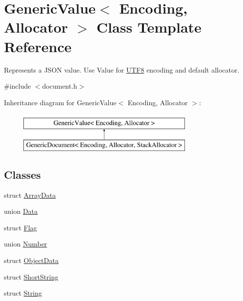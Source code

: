 \hypertarget{classGenericValue}{}\section{Generic\+Value$<$ Encoding, Allocator $>$ Class Template Reference}
\label{classGenericValue}


Represents a J\+S\+ON value. Use Value for \hyperlink{structUTF8}{U\+T\+F8} encoding and default allocator.  




{\ttfamily \#include $<$document.\+h$>$}

Inheritance diagram for Generic\+Value$<$ Encoding, Allocator $>$\+:\begin{figure}[H]
\begin{center}
\leavevmode
\includegraphics[height=2.000000cm]{classGenericValue}
\end{center}
\end{figure}
\subsection*{Classes}
\begin{DoxyCompactItemize}
\item 
struct \hyperlink{structGenericValue_1_1ArrayData}{Array\+Data}
\item 
union \hyperlink{unionGenericValue_1_1Data}{Data}
\item 
struct \hyperlink{structGenericValue_1_1Flag}{Flag}
\item 
union \hyperlink{unionGenericValue_1_1Number}{Number}
\item 
struct \hyperlink{structGenericValue_1_1ObjectData}{Object\+Data}
\item 
struct \hyperlink{structGenericValue_1_1ShortString}{Short\+String}
\item 
struct \hyperlink{structGenericValue_1_1String}{String}
\end{DoxyCompactItemize}
